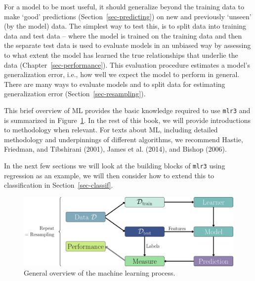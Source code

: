 For a model to be most useful, it should generalize beyond the training
data to make `good' predictions (Section~\ref{sec-predicting}) on new
and previously `unseen' (by the model) data. The simplest way to test
this, is to split data into training data and test
data -- where the model is trained on the training
data and then the separate test data is used to evaluate models in an
unbiased way by assessing to what extent the model has learned the true
relationships that underlie the data (Chapter~\ref{sec-performance}).
This evaluation procedure estimates a model's generalization
error, i.e., how well we expect the model to perform
in general. There are many ways to evaluate models and to split data for
estimating generalization error (Section~\ref{sec-resampling}).

This brief overview of ML provides the basic knowledge required to use
\texttt{mlr3} and is summarized in
Figure~\ref{fig-ml-abstraction-basics}. In the rest of this book, we
will provide introductions to methodology when relevant. For texts about
ML, including detailed methodology and underpinnings of different
algorithms, we recommend Hastie, Friedman, and Tibshirani (2001), James
et al. (2014), and Bishop (2006).

In the next few sections we will look at the building blocks of
\texttt{mlr3} using regression as an example, we will then consider how
to extend this to classification in Section~\ref{sec-classif}.

\begin{figure}

{\centering \includegraphics[width=1\textwidth,height=\textheight]{chapters/chapter2/Figures/mlr3book_figures-1.png}

}

\caption{\label{fig-ml-abstraction-basics}General overview of the
machine learning process.}

\end{figure}

